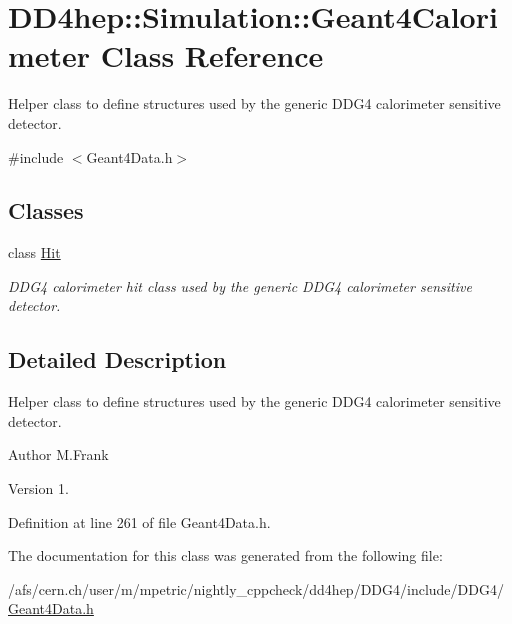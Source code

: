 \hypertarget{class_d_d4hep_1_1_simulation_1_1_geant4_calorimeter}{}\section{D\+D4hep\+:\+:Simulation\+:\+:Geant4\+Calorimeter Class Reference}
\label{class_d_d4hep_1_1_simulation_1_1_geant4_calorimeter}


Helper class to define structures used by the generic D\+D\+G4 calorimeter sensitive detector.  




{\ttfamily \#include $<$Geant4\+Data.\+h$>$}

\subsection*{Classes}
\begin{DoxyCompactItemize}
\item 
class \hyperlink{class_d_d4hep_1_1_simulation_1_1_geant4_calorimeter_1_1_hit}{Hit}
\begin{DoxyCompactList}\small\item\em D\+D\+G4 calorimeter hit class used by the generic D\+D\+G4 calorimeter sensitive detector. \end{DoxyCompactList}\end{DoxyCompactItemize}


\subsection{Detailed Description}
Helper class to define structures used by the generic D\+D\+G4 calorimeter sensitive detector. 

\begin{DoxyAuthor}{Author}
M.\+Frank 
\end{DoxyAuthor}
\begin{DoxyVersion}{Version}
1. 
\end{DoxyVersion}


Definition at line 261 of file Geant4\+Data.\+h.



The documentation for this class was generated from the following file\+:\begin{DoxyCompactItemize}
\item 
/afs/cern.\+ch/user/m/mpetric/nightly\+\_\+cppcheck/dd4hep/\+D\+D\+G4/include/\+D\+D\+G4/\hyperlink{_geant4_data_8h}{Geant4\+Data.\+h}\end{DoxyCompactItemize}
